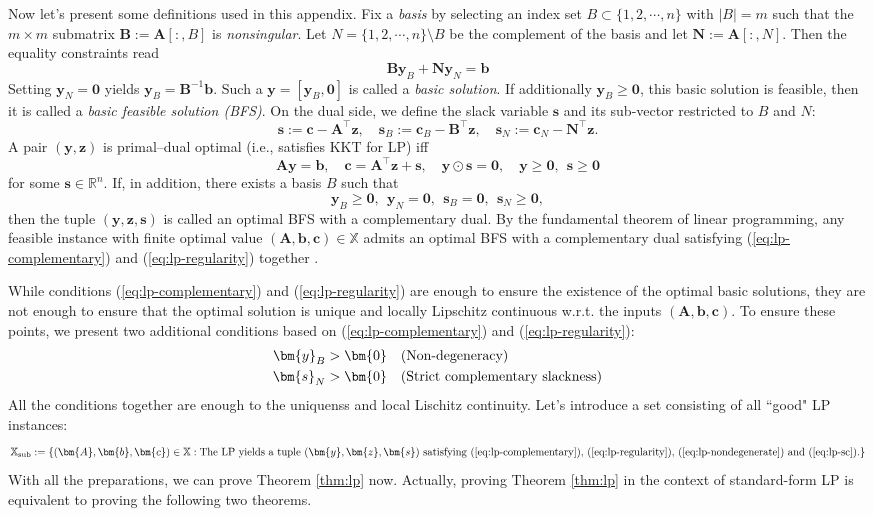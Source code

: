 \documentclass{amsart} %
\def\eqref#1{equation~\ref{#1}}
\def\vzero{{\bm{0}}}
\def\vb{{\bm{b}}}
\def\vc{{\bm{c}}}
\def\vs{{\bm{s}}}
\def\vy{{\bm{y}}}
\def\vz{{\bm{z}}}
\def\mA{{\bm{A}}}
\def\mB{{\bm{B}}}
\def\mN{{\bm{N}}}
\def\sR{{\mathbb{R}}}
\def\sX{{\mathbb{X}}}
\theoremstyle{definition}
\theoremstyle{remark}
\renewcommand{\eqref}[1]{\textup{(\ref{#1})}}
\begin{document}
Now let's present some definitions used in this appendix. Fix a \textit{basis} by selecting an index set $B \subset \{1,2,\cdots,n\}$ with $|B|=m$ such that the $m \times m$ submatrix $\mB:=\mA[:,B]$ is \textit{nonsingular}. Let $N=\{1,2,\cdots,n\} \setminus B$ be the complement of the basis and let $\mN:=\mA[:,N]$. Then the equality constraints read
\[\mB \vy_{B} + \mN \vy_{N} = \vb\]
Setting $\vy_{N}=\vzero$ yields $\vy_{B} = \mB^{-1}\vb$. Such a $\vy = [\vy_{B}, \vzero]$ is called a \textit{basic solution}. If additionally $\vy_{B} \geq \vzero$, this basic solution is feasible, then it is called a \textit{basic feasible solution (BFS)}. On the dual side, we define the slack variable $\vs$ and its sub-vector restricted to $B$ and $N$:
\[ \vs := \vc - \mA^\top \vz, \quad \vs_{B} := \vc_{B} - \mB^\top \vz, \quad \vs_{N} := \vc_{N} - \mN^\top \vz. \]
A pair $(\vy,\vz)$ is primal–dual optimal (i.e., satisfies KKT for LP) iff
\begin{equation}
\label{eq:lp-complementary}
\mA \vy = \vb,\quad \vc = \mA^\top \vz + \vs, \quad \vy\odot\vs=\vzero, \quad \vy \geq \vzero,~~\vs \geq \vzero
\end{equation}
for some $\vs \in \sR^n$. If, in addition, there exists a basis $B$ such that
\begin{equation}
\label{eq:lp-regularity}
\vy_{B} \geq \vzero, ~~\vy_{N} = \vzero, ~~\vs_{B} = \vzero, ~~\vs_{N} \geq \vzero,
\end{equation}
then the tuple $(\vy,\vz,\vs)$ is called an optimal BFS with a complementary dual. By the fundamental theorem of linear programming, any feasible instance with finite optimal value $(\mA,\vb,\vc) \in \sX$ admits an optimal BFS with a complementary dual satisfying \eqref{eq:lp-complementary} and \eqref{eq:lp-regularity} together \cite{bertsimas1997introduction}.

While conditions \eqref{eq:lp-complementary} and \eqref{eq:lp-regularity} are enough to ensure the existence of the optimal basic solutions, they are not enough to ensure that the optimal solution is unique and locally Lipschitz continuous w.r.t. the inputs $(\mA,\vb,\vc)$. To ensure these points, we present two additional conditions based on \eqref{eq:lp-complementary} and \eqref{eq:lp-regularity}:
\begin{align}
\vy_B > \vzero & \quad  (\textup{Non-degeneracy}) \label{eq:lp-nondegenerate} \\
\vs_N > \vzero & \quad (\textup{Strict complementary slackness}) \label{eq:lp-sc}
\end{align}
All the conditions together are enough to the uniquenss and local Lischitz continuity. Let's introduce a set consisting of all ``good" LP instances:
\[ \sX_{\mathrm{sub}}:= \{(\mA,\vb,\vc) \in \sX: \textup{The LP yields a tuple $(\vy,\vz,\vs)$ satisfying \eqref{eq:lp-complementary}, \eqref{eq:lp-regularity}, \eqref{eq:lp-nondegenerate} and \eqref{eq:lp-sc}.}\} \]
With all the preparations, we can prove Theorem \ref{thm:lp} now. Actually, proving Theorem \ref{thm:lp} in the context of standard-form LP is equivalent to proving the following two theorems.
\end{document}
